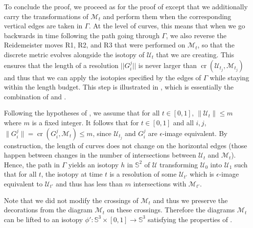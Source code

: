 \documentclass{article}
\newcommand{\Sp}{\mathbb{S}}
\newcommand{\cross}{\operatorname{cr}}
\begin{document}
To conclude the proof, we proceed as for the proof of  except that we additionally carry the transformations of $\mathcal{M}_t$ and perform them when the corresponding vertical edges are taken in $\Gamma$. At the level of curves, this means that when we go backwards in time following the path going through $\Gamma$, we also reverse the Reidemeister moves R1, R2, and R3 that were performed on $\mathcal{M}_t$, so that the discrete metric evolves alongside the isotopy of $\mathcal{U}_t$ that we are creating. This ensures that the length of a resolution $||G^j_i||$ is never larger than $\cross(\mathcal{U}_{t_j},\mathcal{M}_{t_j})$ and thus that we can apply the isotopies specified by the edges of $\Gamma$ while staying within the length budget. This step is illustrated in , which is essentially the combination of  and . 

Following the hypotheses of , we assume that for all $t \in [0,1]$, $\| \mathcal{U}_t \| \leq m$ where $m$ is a fixed integer. It follows that for $t \in [0,1]$ and all $i,j$, $\| G^j_i \| = \cross (G^j_i , \mathcal{M}_t) \leq m$, since $\mathcal{U}_{t_j}$ and $G^j_i$ are $\epsilon$-image equivalent. By construction, the length of curves does not change on the horizontal edges (those happen between changes in the number of intersections between $\mathcal{U}_t$ and $\mathcal{M}_t$). Hence, the path in $\Gamma$ yields an isotopy $h$ in $\Sp^2$ of $\mathcal{U}$ transforming $\mathcal{U}_0$ into $\mathcal{U}_1$ such that for all $t$, the isotopy at time $t$ is a resolution of some $\mathcal{U}_{t'}$ which is $\epsilon$-image equivalent to $ \mathcal{U}_{t'}$ and thus has less than $m$ intersections with $\mathcal{M}_{t'}$. 

Note that we did not modify the crossings of $\mathcal{M}_t$ and thus we preserve the decorations from the diagram $\mathcal{M}_t$ on these crossings. Therefore the diagrams $\mathcal{M}_t$ can be lifted to an isotopy $\phi' : \Sp^3 \times [0,1] \rightarrow \Sp^3$ satisfying the properties of .
\end{document}
